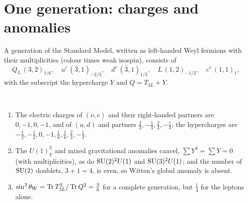 \section{One generation: charges and anomalies}

A generation of the Standard Model, written as left-handed Weyl fermions with their multiplicities (colour times weak isospin), consists of
\[
Q_L\,(3,2)_{1/6},\quad u^c\,(\bar3,1)_{-2/3},\quad d^c\,(\bar3,1)_{1/3},\quad L\,(1,2)_{-1/2},\quad e^c\,(1,1)_{1},
\]
with the subscript the hypercharge $Y$ and $Q=T_{3L}+Y$.

\begin{theorem}\label{thm:smcharges}\ver\
\begin{enumerate}[label=(\roman*)]
\item The electric charges of $(\nu,e)$ and their right-handed partners are $0,-1,0,-1$, and of $(u,d)$ and partners $\frac23,-\frac13,\frac23,-\frac13$; the hypercharges are $-\frac12,-\frac12,0,-1,\frac16,\frac16,\frac23,-\frac13$.
\item The $U(1)_Y^3$ and mixed gravitational anomalies cancel, $\sum Y^3=\sum Y=0$ (with multiplicities), as do $\mathrm{SU}(2)^2U(1)$ and $\mathrm{SU}(3)^2U(1)$; and the number of $\mathrm{SU}(2)$ doublets, $3+1=4$, is even, so Witten's global anomaly is absent.
\item $\sin^2\theta_W=\operatorname{Tr} T_{3L}^2/\operatorname{Tr} Q^2=\frac38$ for a complete generation, but $\frac14$ for the leptons alone.
\end{enumerate}
\end{theorem}
